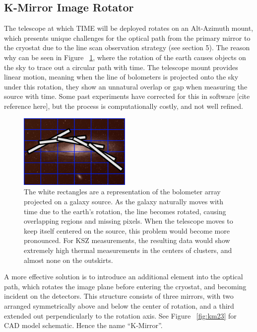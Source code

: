 \documentclass[manuscript]{aastex}
\begin{document}
\subsection{K-Mirror Image Rotator}
The telescope at which TIME will be deployed rotates on an Alt-Azimuth mount, which presents unique challenges for the optical path from the primary mirror to the cryostat due to the line scan observation strategy (see section 5). The reason why can be seen in Figure ~\ref{fig:km1}, where the rotation of the earth causes objects on the sky to trace out a circular path with time. The telescope mount provides linear motion, meaning when the line of bolometers is projected onto the sky under this rotation, they show an unnatural overlap or gap when measuring the source with time. Some past experiments have corrected for this in software [cite reference here], but the process is computationally costly, and not well refined. 
\begin{figure}
\vspace{-0.8cm}
  \begin{center}
    \includegraphics[width=0.48\textwidth]{km1.png}
  \end{center}
  \caption[Diagram of Bolometer De-rotation on Source from Alt-Az Mount.]{The white rectangles are a representation of the bolometer array projected on a galaxy source. As the galaxy naturally moves with time due to the earth's rotation, the line becomes rotated, causing overlapping regions and missing pixels. When the telescope moves to keep itself centered on the source, this problem would become more pronounced. For KSZ measurements, the resulting data would show extremely high thermal measurements in the centers of clusters, and almost none on the outskirts.}
  \label{fig:km1}
\end{figure}
A more effective solution is to introduce an additional element into the optical path, which rotates the image plane before entering the cryostat, and becoming incident on the detectors. This structure consists of three mirrors, with two arranged symmetrically above and below the center of rotation, and a third extended out perpendicularly to the rotation axis. See Figure ~\ref{fig:km23} for CAD model schematic. Hence the name ``K-Mirror''. 
\end{document}
